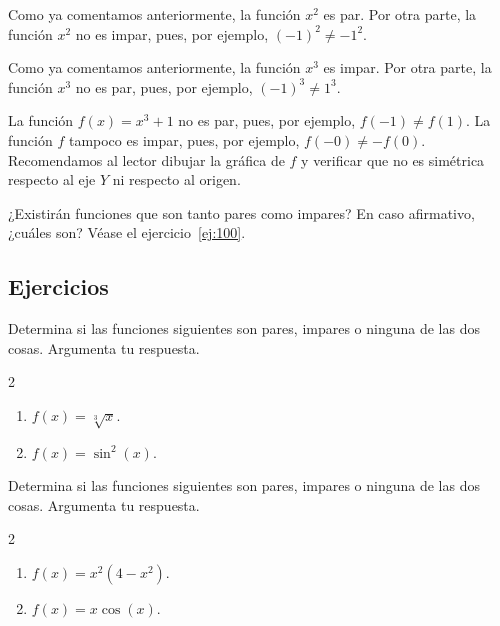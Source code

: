 \documentclass[12pt,a4paper]{book}
\begin{document}
    \begin{ejemplo}\label{ejm:25}
        Como ya comentamos anteriormente, la función $x^{2}$ es par. Por
        otra parte, la función $x^{2}$ no es impar, pues, por ejemplo, $(-1)^{2}\neq -1^{2}$.
    \end{ejemplo}

    \begin{ejemplo}\label{ejm:26}
        Como ya comentamos anteriormente, la función $x^{3}$ es impar.
        Por otra parte, la función $x^{3}$ no es par, pues, por ejemplo, $(-1)^{3}\neq 1^{3}$.
    \end{ejemplo}

    \begin{ejemplo}\label{ejm:27}
        La función $f(x)=x^{3}+1$ no es par, pues, por ejemplo, $f(-1)\neq
        f(1)$. La función $f$ tampoco es impar, pues, por ejemplo, $f(-0)\neq -f(0)$.
        Recomendamos al lector dibujar la gráfica de $f$ y verificar que no es simétrica
        respecto al eje $Y$ ni respecto al origen.
    \end{ejemplo}

    ¿Existirán funciones que son tanto pares como impares? En caso afirmativo,
    ¿cuáles son? Véase el ejercicio~\ref{ej:100}.

    \par{}\subsection*{Ejercicios}

    \begin{ejercicio}\label{ej:98}
        Determina si las funciones siguientes son pares, impares o ninguna
        de las dos cosas. Argumenta tu respuesta.
        \begin{multicols}{2}
        \begin{enumerate}[nosep]
            \item $f(x)=\sqrt[3]{x}$.
            \item $f(x)=\sin^{2}(x)$.
        \end{enumerate}
        \end{multicols}
    \end{ejercicio}

    \begin{ejercicio}\label{ej:99}
        Determina si las funciones siguientes son pares, impares o ninguna
        de las dos cosas. Argumenta tu respuesta.
        \begin{multicols}{2}
        \begin{enumerate}[nosep]
            \item $f(x)=x^{2}\left(4-x^{2}\right)$.
            \item $f(x)=x\cos(x)$.
        \end{enumerate}
        \end{multicols}
    \end{ejercicio}
\end{document}
